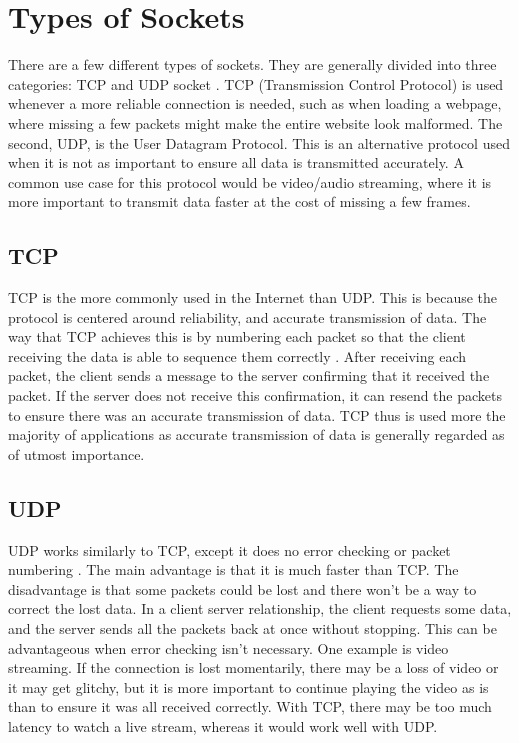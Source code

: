 \documentclass[conference, 12pt]{IEEEtran}
\begin{document}
\section{Types of Sockets}
There are a few different types of sockets. They are generally divided into three categories: TCP and UDP socket \cite{sawant2013network}. TCP (Transmission Control Protocol) is used whenever a more reliable connection is needed, such as when loading a webpage, where missing a few packets might make the entire website look malformed. The second, UDP, is the User Datagram Protocol. This is an alternative protocol used when it is not as important to ensure all data is transmitted accurately. A common use case for this protocol would be video/audio streaming, where it is more important to transmit data faster at the cost of missing a few frames.

\subsection{TCP}
TCP is the more commonly used in the Internet than UDP. This is because the protocol is centered around reliability, and accurate transmission of data. The way that TCP achieves this is by numbering each packet so that the client receiving the data is able to sequence them correctly \cite{hoffmans}. After receiving each packet, the client sends a message to the server confirming that it received the packet. If the server does not receive this confirmation, it can resend the packets to ensure there was an accurate transmission of data. TCP thus is used more the majority of applications as accurate transmission of data is generally regarded as of utmost importance.

\subsection{UDP}
UDP works similarly to TCP, except it does no error checking or packet numbering \cite{hoffmans}. The main advantage is that it is much faster than TCP. The disadvantage is that some packets could be lost and there won’t be a way to correct the lost data. In a client server relationship, the client requests some data, and the server sends all the packets back at once without stopping. This can be advantageous when error checking isn’t necessary. One example is video streaming. If the connection is lost momentarily, there may be a loss of video or it may get glitchy, but it is more important to continue playing the video as is than to ensure it was all received correctly. With TCP, there may be too much latency to watch a live stream, whereas it would work well with UDP.
\end{document}
